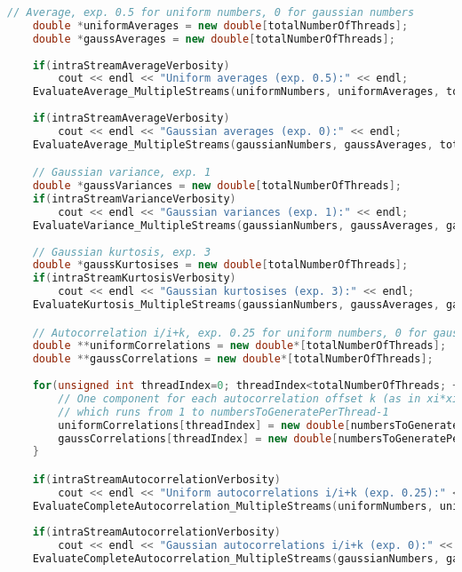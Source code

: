 \begin{lstlisting}[language=C++, caption={\texttt{libraries/CoreLibraries/RandomGenerator/CorrelationTest.cu}}]
	// Average, exp. 0.5 for uniform numbers, 0 for gaussian numbers
	double *uniformAverages = new double[totalNumberOfThreads];
	double *gaussAverages = new double[totalNumberOfThreads];
	
	if(intraStreamAverageVerbosity)
		cout << endl << "Uniform averages (exp. 0.5):" << endl;
	EvaluateAverage_MultipleStreams(uniformNumbers, uniformAverages, totalNumberOfThreads, numbersToGeneratePerThread, intraStreamAverageVerbosity);
	
	if(intraStreamAverageVerbosity)
		cout << endl << "Gaussian averages (exp. 0):" << endl;
	EvaluateAverage_MultipleStreams(gaussianNumbers, gaussAverages, totalNumberOfThreads, numbersToGeneratePerThread, intraStreamAverageVerbosity);

	// Gaussian variance, exp. 1
	double *gaussVariances = new double[totalNumberOfThreads];
	if(intraStreamVarianceVerbosity)
		cout << endl << "Gaussian variances (exp. 1):" << endl;
	EvaluateVariance_MultipleStreams(gaussianNumbers, gaussAverages, gaussVariances, totalNumberOfThreads, numbersToGeneratePerThread, intraStreamVarianceVerbosity);
	
	// Gaussian kurtosis, exp. 3
	double *gaussKurtosises = new double[totalNumberOfThreads];
	if(intraStreamKurtosisVerbosity)
		cout << endl << "Gaussian kurtosises (exp. 3):" << endl;
	EvaluateKurtosis_MultipleStreams(gaussianNumbers, gaussAverages, gaussVariances, gaussKurtosises, totalNumberOfThreads, numbersToGeneratePerThread, intraStreamKurtosisVerbosity);

	// Autocorrelation i/i+k, exp. 0.25 for uniform numbers, 0 for gaussian numbers
	double **uniformCorrelations = new double*[totalNumberOfThreads];
	double **gaussCorrelations = new double*[totalNumberOfThreads];
	
	for(unsigned int threadIndex=0; threadIndex<totalNumberOfThreads; ++threadIndex){
		// One component for each autocorrelation offset k (as in xi*xi+k)
		// which runs from 1 to numbersToGeneratePerThread-1
		uniformCorrelations[threadIndex] = new double[numbersToGeneratePerThread-2];	
		gaussCorrelations[threadIndex] = new double[numbersToGeneratePerThread-2];
	}

	if(intraStreamAutocorrelationVerbosity)
		cout << endl << "Uniform autocorrelations i/i+k (exp. 0.25):" << endl;
	EvaluateCompleteAutocorrelation_MultipleStreams(uniformNumbers, uniformCorrelations, totalNumberOfThreads, numbersToGeneratePerThread, intraStreamAutocorrelationVerbosity);
	
	if(intraStreamAutocorrelationVerbosity)
		cout << endl << "Gaussian autocorrelations i/i+k (exp. 0):" << endl;
	EvaluateCompleteAutocorrelation_MultipleStreams(gaussianNumbers, gaussCorrelations, totalNumberOfThreads, numbersToGeneratePerThread, intraStreamAutocorrelationVerbosity);


\end{lstlisting}
